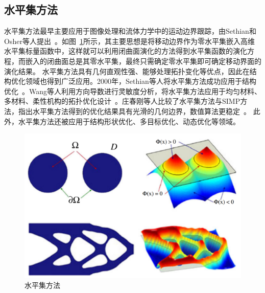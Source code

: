 \subsection{水平集方法}
水平集方法最早主要应用于图像处理和流体力学中的运动边界跟踪，由Sethian和Osher等人提出~\cite{OSHER1988,OSHER2001}。如图~\ref{level-set}所示，其主要思想是将移动边界作为零水平集嵌入高维水平集标量函数中，这样就可以利用闭曲面演化的方法得到水平集函数的演化方程，而嵌入的闭曲面总是其零水平集，最终只需确定零水平集即可确定移动界面的演化结果。
水平集方法具有几何直观性强、能够处理拓扑变化等优点，因此在结构优化领域也得到广泛应用。2000年，Sethian等人将水平集方法成功应用于结构优化~\cite{SETHIAN2000}。Wang等人利用方向导数进行灵敏度分析，将水平集方法应用于均匀材料、多材料、柔性机构的拓扑优化设计~\cite{Wang2003,Wang2004}。庄春刚等人比较了水平集方法与SIMP方法，指出水平集方法得到的优化结果具有光滑的几何边界，数值算法更稳定~\cite{zhuang2007}。
此外，水平集方法还被应用于结构形状优化、多目标优化、动态优化等领域。
\begin{figure}[htpb]
\centering
\includegraphics[width=0.9\linewidth]{./figures/intro-level}
\caption{水平集方法~\cite{deaton2014survey}}
\label{level-set}
\end{figure}


